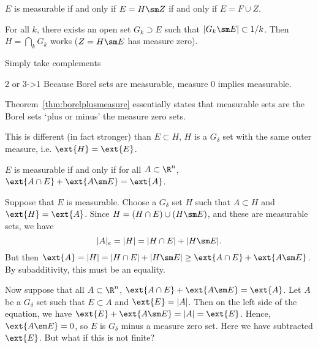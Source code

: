  \begin{thm} \label{thm:borelplusmeasure}
 $E$ is measurable if and only if $E= H \sm Z$ if and only if $E= F \cup Z$. 
 \end{thm}

\pf For all $k$, there exists an open set $G_k \supset E$ such that $|G_k\sm E| \subset 1/k$. Then $H= \bigcap_k G_k$ works ($Z=H \sm E$ has measure zero). 



Simply take complements

2 or 3->1 Because Borel sets are measurable, measure 0 implies measurable. 




Theorem~\ref{thm:borelplusmeasure} essentially states that measurable sets are the Borel sets `plus or minus' the measure zero sets. 



\begin{rem}
This is different (in fact stronger) than $E \subset H$, $H$ is a $G_\delta$ set with the same outer measure, i.e. $\ext{H}=\ext{E}$. 
\end{rem}

\begin{thm}
$E$ is measurable if and only if for all $A \subset \R^n$, $\ext{A \cap E}+\ext{A\sm E}=\ext{A}$.
\end{thm}

\pf Suppose that $E$ is measurable. Choose a $G_\delta$ set $H$ such that $A \subset H$ and $\ext{H}=\ext{A}$. Since $H= (H \cap E) \cup (H \sm E)$, and these are measurable sets, we have
	\[
	|A|_e=|H|= |H \cap E| + |H \sm E|.
	\]
But then $\ext{A} = |H|= |H \cap E| + |H\sm E| \geq \ext{A \cap E} + \ext{A \sm E}$. By subadditivity, this must be an equality. 

Now suppose that all $A \subset \R^n$, $\ext{A \cap E}+\ext{A\sm E}=\ext{A}$. Let $A$ be a $G_\delta$ set such that $E \subset A$ and $\ext{E}=|A|$. Then on the left side of the equation, we have $\ext{E}+\ext{A\sm E}= |A|=\ext{E}$. Hence, $\ext{A \sm E}=0$, so $E$ is $G_\delta$ minus a measure zero set. Here we have subtracted $\ext{E}$. But what if this is not finite? 

